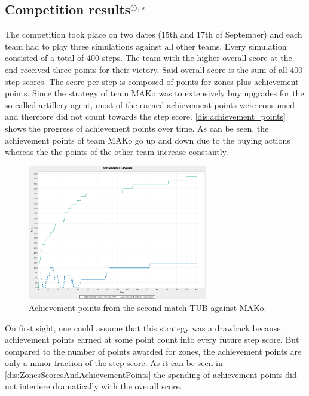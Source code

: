 \subsection{Competition results$^{\odot,\circ}$} %
The competition took place on two dates (15th and 17th of September) and each team had to play three simulations against all other teams.
Every simulation consisted of a total of 400 steps.
The team with the higher overall score at the end received three points for their victory.
Said overall score is the sum of all 400 step scores.
The score per step is composed of points for zones plus achievement points.
Since the strategy of team MAKo was to extensively buy upgrades for the so-called artillery agent, most of the earned achievement points were consumed and therefore did not count towards the step score.
\autoref{dis:achievement_points} shows the progress of achievement points over time.
As can be seen, the achievement points of team MAKo go up and down due to the buying actions whereas the the points of the other team increase constantly.
\begin{figure}[ht]
	\centering
	\includegraphics[width=0.7\textwidth]{images/AchievementPoints.png}
	\caption{Achievement points from the second match TUB against MAKo.} %
	\label{dis:achievement_points}
\end{figure}
On first sight, one could assume that this strategy was a drawback because achievement points earned at some point count into every future step score.
But compared to the number of points awarded for zones, the achievement points are only a minor fraction of the step score.
As it can be seen in \autoref{dis:ZonesScoresAndAchievementPoints} the spending of achievement points did not interfere dramatically with the overall score.
